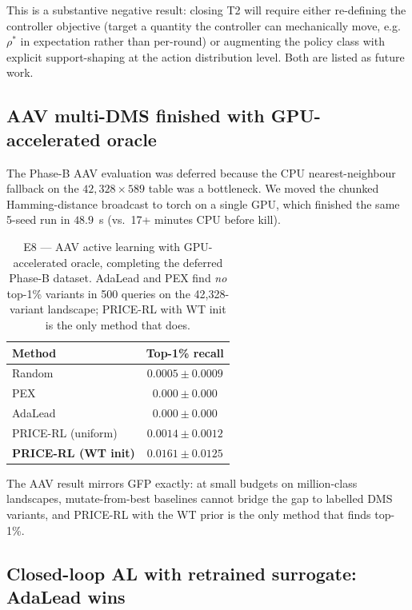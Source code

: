 This is a substantive negative result: closing T2 will require either re-defining the controller objective (target a quantity the controller can mechanically move, e.g.\ $\rho^*$ in expectation rather than per-round) or augmenting the policy class with explicit support-shaping at the action distribution level. Both are listed as future work.

\subsection{AAV multi-DMS finished with GPU-accelerated oracle}
\label{sec:e8}

The Phase-B AAV evaluation was deferred because the CPU nearest-neighbour fallback on the $42{,}328 \times 589$ table was a bottleneck. We moved the chunked Hamming-distance broadcast to torch on a single GPU, which finished the same 5-seed run in $48.9$~s (vs.\ 17+ minutes CPU before kill).

\begin{table}[t]
\centering
\caption{E8 --- AAV active learning with GPU-accelerated oracle, completing the deferred Phase-B dataset. AdaLead and PEX find \emph{no} top-1\% variants in 500 queries on the 42{,}328-variant landscape; PRICE-RL with WT init is the only method that does.}
\label{tab:e8}
\begin{tabular}{lc}
\toprule
Method & Top-1\% recall \\
\midrule
Random                              & $0.0005 \pm 0.0009$ \\
PEX                                 & $0.000 \pm 0.000$ \\
AdaLead                             & $0.000 \pm 0.000$ \\
PRICE-RL (uniform)                  & $0.0014 \pm 0.0012$ \\
\textbf{PRICE-RL (WT init)}         & $\mathbf{0.0161 \pm 0.0125}$ \\
\bottomrule
\end{tabular}
\end{table}

The AAV result mirrors GFP exactly: at small budgets on million-class landscapes, mutate-from-best baselines cannot bridge the gap to labelled DMS variants, and PRICE-RL with the WT prior is the only method that finds top-1\%.

\subsection{Closed-loop AL with retrained surrogate: AdaLead wins}
\label{sec:e9}

